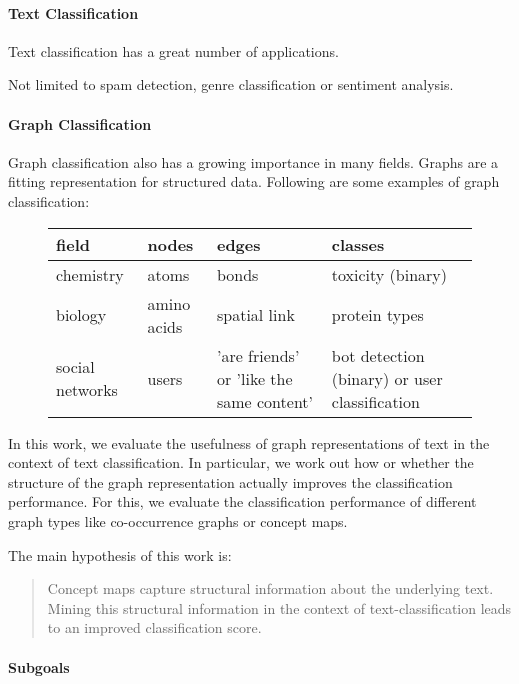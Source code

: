 
\paragraph{Text Classification}
Text classification has a great number of applications.

Not limited to spam detection, genre classification or sentiment analysis.

\paragraph{Graph Classification}
Graph classification also has a growing importance in many fields. Graphs are a fitting representation for structured data. Following are some examples of graph classification:

\begin{figure}[h]
\centering
\begin{tabular}{llll}
field &  nodes &  edges & classes\\
\midrule
chemistry & atoms & bonds & toxicity (binary)\\
biology & amino acids & spatial link & protein types \\ 
social networks & users & 'are friends' or 'like the same content' & bot detection (binary) or user classification
\end{tabular}
\end{figure}

In this work, we evaluate the usefulness of graph representations of text in the context of text classification. In particular, we work out how or whether the structure of the graph representation actually improves the classification performance.
For this, we evaluate the classification performance of different graph types like co-occurrence graphs or concept maps.

The main hypothesis of this work is:
\begin{quote}
Concept maps capture structural information about the underlying text. Mining this structural information in the context of text-classification leads to an improved classification score.
\end{quote}

\paragraph{Subgoals}

